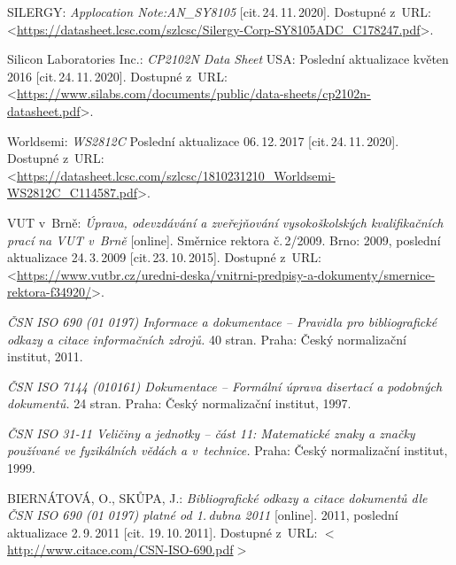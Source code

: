 \begin{thebibliography}{99}
    SILERGY:
    \emph{Applocation Note:AN\_SY8105}
    [cit.\,24.\,11.\,2020].
    Dostupné z~URL:\\
    <\url{https://datasheet.lcsc.com/szlcsc/Silergy-Corp-SY8105ADC_C178247.pdf}>.

    Silicon Laboratories Inc.:
    \emph{CP2102N Data Sheet}
    USA: Poslední aktualizace květen 2016 [cit.\,24.\,11.\,2020].
    Dostupné z~URL:\\
    <\url{https://www.silabs.com/documents/public/data-sheets/cp2102n-datasheet.pdf}>.

    Worldsemi:
    \emph{WS2812C}
    Poslední aktualizace 06.\,12.\,2017 [cit.\,24.\,11.\,2020].
    Dostupné z~URL:\\
    <\url{https://datasheet.lcsc.com/szlcsc/1810231210_Worldsemi-WS2812C_C114587.pdf}>.

		VUT v~Brně:
    \emph{Úprava, odevzdávání a zveřejňování vysokoškolských kva\-li\-fi\-kač\-ních prací na VUT v~Brně}\/ [online].
		Směrnice rektora č.\,2/2009.
		Brno: 2009, po\-sled\-ní aktualizace 24.\,3.\,2009 [cit.\,23.\,10.\,2015].
    Dostupné z~URL:\\
    <\url{https://www.vutbr.cz/uredni-deska/vnitrni-predpisy-a-dokumenty/smernice-rektora-f34920/}>.

    \emph{ČSN ISO 690 (01 0197) Informace a dokumentace -- Pravidla pro bibliografické odkazy a citace informačních zdrojů.}
    40 stran. Praha: Český normalizační institut, 2011.

    \emph{ČSN ISO 7144 (010161) Dokumentace -- Formální úprava disertací a podobných dokumentů.}
    24 stran. Praha: Český normalizační institut, 1997.

    \emph{ČSN ISO 31-11 Veličiny a jednotky -- část 11: Matematické znaky a značky používané ve fyzikálních vědách a v~technice.}
    Praha: Český normalizační institut, 1999.

    BIERNÁTOVÁ, O., SKŮPA, J.:
    \emph{Bibliografické odkazy a citace dokumentů dle ČSN ISO 690 (01 0197) platné od 1.\,dubna 2011}\/ [online].
    2011, poslední aktualizace 2.\,9.\,2011 [cit. 19.\,10.\,2011].
    Dostupné z~URL:
    \(<\)\url{http://www.citace.com/CSN-ISO-690.pdf}\(>\)


\end{thebibliography}
